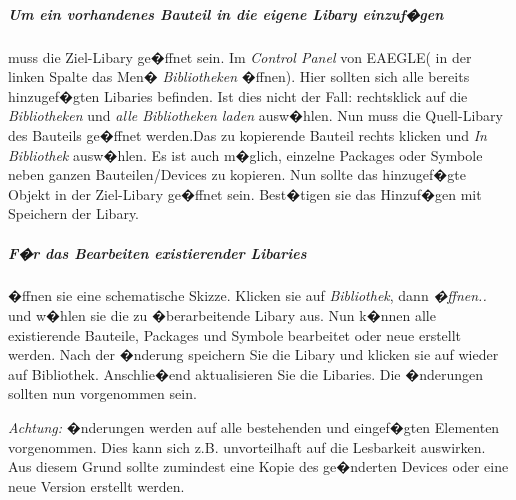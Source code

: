 \subparagraph{Um ein vorhandenes Bauteil in die eigene Libary einzuf�gen} muss die Ziel-Libary ge�ffnet sein. Im \textit{Control Panel} von EAEGLE( in der linken Spalte das Men� \textit{Bibliotheken} �ffnen). Hier sollten sich alle bereits hinzugef�gten Libaries befinden. Ist dies nicht der Fall: rechtsklick auf die \textit{Bibliotheken} und  \textit{alle Bibliotheken laden} ausw�hlen. Nun muss die Quell-Libary des Bauteils ge�ffnet werden.Das zu kopierende Bauteil rechts klicken und \textit{In Bibliothek} ausw�hlen. Es ist auch m�glich, einzelne Packages oder Symbole neben ganzen Bauteilen/Devices zu kopieren. Nun sollte das hinzugef�gte Objekt in der Ziel-Libary ge�ffnet sein. Best�tigen sie das Hinzuf�gen mit Speichern der Libary.

\subparagraph{F�r das Bearbeiten existierender Libaries} �ffnen sie eine schematische Skizze. Klicken sie auf \textit{Bibliothek}, dann \textit{�ffnen..} und w�hlen sie die zu �berarbeitende Libary aus. Nun k�nnen alle existierende Bauteile, Packages und Symbole bearbeitet oder neue erstellt werden.
Nach der �nderung speichern Sie die Libary und klicken sie auf wieder auf Bibliothek. Anschlie�end aktualisieren Sie die Libaries. Die �nderungen sollten nun vorgenommen sein.

\textit{Achtung:} �nderungen werden auf alle bestehenden und eingef�gten Elementen vorgenommen. Dies kann sich z.B. unvorteilhaft auf die Lesbarkeit auswirken. Aus diesem Grund sollte zumindest eine Kopie des ge�nderten Devices oder eine neue Version erstellt werden. 
